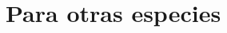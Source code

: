 \documentclass[a4paper,oneside,11pt]{book}
\begin{document}
\begin{figure} [!h]
  \begin{center}
   \end{center}
   \end{figure}
 
 \section{Para otras especies}
 
\end{document}
